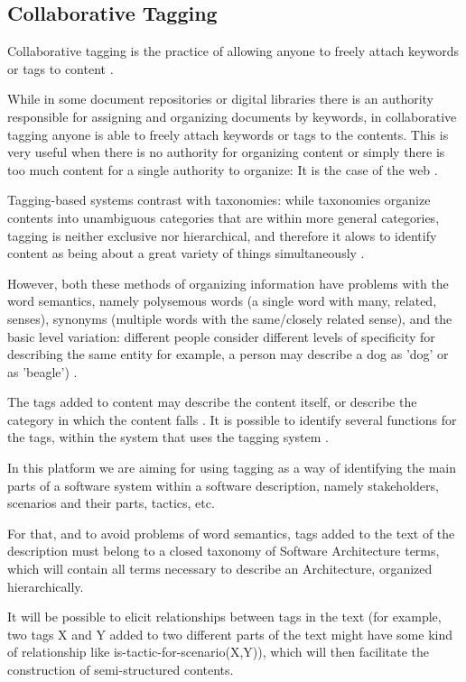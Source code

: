 \subsection{Collaborative Tagging}
Collaborative tagging is the practice of allowing anyone to freely attach keywords or tags to content \cite{golder2006usage}.

While in some document repositories or digital libraries there is an authority responsible for assigning and organizing documents by keywords, in collaborative tagging anyone is able to freely attach keywords or tags to the contents. This is very useful when there is no authority for organizing content or simply there is too much content for a single authority to organize: It is the case of the web \cite{golder2006usage}.

Tagging-based systems contrast with taxonomies: while taxonomies organize contents into unambiguous categories that are within more general categories, tagging is neither exclusive nor hierarchical, and therefore it alows to identify content as being about a great variety of things simultaneously \cite{golder2006usage}. 

However, both these methods of organizing information have problems with the word semantics, namely polysemous words (a single word with many, related, senses), synonyms (multiple words with the same/closely related sense), and the basic level variation: different people consider different levels of specificity for describing the same entity for example, a person may describe a dog as 'dog' or as 'beagle') \cite{tanaka1991object}. 

The tags added to content may describe the content itself, or describe the category in which the content falls \cite{coates2005two}. It is possible to identify several functions for the tags, within the system that uses the tagging system \cite{golder2006usage}.

In this platform we are aiming for using tagging as a way of identifying the main parts of a software system within a software description, namely stakeholders, scenarios and their parts, tactics, etc. 

For that, and to avoid problems of word semantics, tags added to the text of the description must belong to a closed taxonomy of Software Architecture terms, which will contain all terms necessary to describe an Architecture, organized hierarchically. 

It will be possible to elicit relationships between tags in the text (for example, two tags X and Y added to two different parts of the text might have some kind of relationship like is-tactic-for-scenario(X,Y)), which will then facilitate the construction of semi-structured contents.


